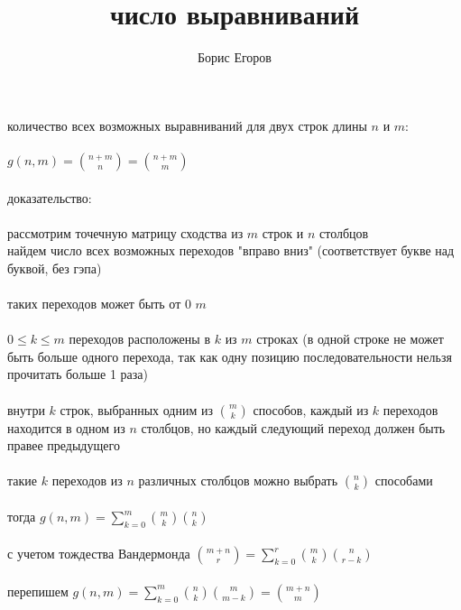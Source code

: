 \documentclass[a4paper]{article}
\author{Борис Егоров}
\title{число выравниваний}
\begin{document}
	\maketitle
	\begin{large}
	количество всех возможных выравниваний для двух строк длины $n$ и $m$:\\
		\\
		$g(n, m)={n+m \choose n}={n+m \choose m}$\\
		\\
		доказательство:\\
		\\
		рассмотрим точечную матрицу сходства из $m$ строк и $n$ столбцов\\
		найдем число всех возможных переходов "вправо вниз" (соответствует букве над буквой, без гэпа)\\
		\\
		таких переходов может быть от $0$ $m$\\
		\\
		$0 \le k \le m$ переходов расположены в $k$ из $m$ строках (в одной строке не может быть больше одного перехода, так как одну позицию последовательности нельзя прочитать больше 1 раза)\\
		\\
		внутри $k$ строк, выбранных одним из ${m \choose k}$ способов, каждый из $k$ переходов находится в одном из $n$ столбцов, но каждый следующий переход должен быть правее предыдущего\\
		\\
		такие $k$ переходов из $n$ различных столбцов можно выбрать ${n \choose k}$ способами\\
		\\
		тогда $g(n,m)=\sum_{k=0}^{m} {m \choose k}{n \choose k}$\\
		\\
		с учетом тождества Вандермонда ${m+n \choose r}=\sum_{k=0}^{r} {m \choose k}{n \choose r-k}$\\
		\\
		перепишем $g(n,m)=\sum_{k=0}^{m} {n \choose k}{m \choose m-k}={m+n \choose m}$
	\end{large}
\end{document}
